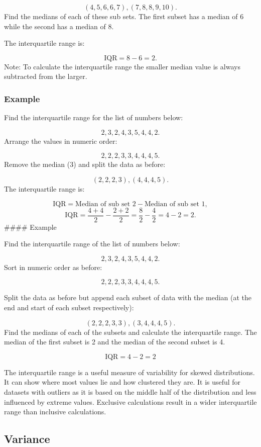 \documentclass[
]{book}
\begin{document}
\[ (4, 5, 6, 6, 7), (7, 8, 8, 9, 10). \]
Find the medians of each of these sub sets. The first subset has a median of 6 while the second has a median of 8.

The interquartile range is:

\[ \textrm{IQR} = 8 - 6 = 2.\]
Note: To calculate the interquartile range the smaller median value is always subtracted from the larger.

\hypertarget{example-9}{%
\subsubsection{Example}\label{example-9}}

Find the interquartile range for the list of numbers below:

\[2, 3, 2, 4, 3, 5, 4, 4, 2.\]
Arrange the values in numeric order:

\[2, 2, 2, 3, 3, 4, 4, 4, 5. \]
Remove the median (3) and split the data as before:

\[ (2, 2, 2, 3), (4, 4, 4, 5).\]
The interquartile range is:

\[ \textrm{IQR}=\textrm{Median of sub set 2}- \textrm{Median of sub set 1},\]
\[ \textrm{IQR}=\frac{4+4}{2} - \frac{2+2}{2}=\frac{8}{2} - \frac{4}{2} = 4 - 2= 2.\]
\#\#\#\# Example

Find the interquartile range of the list of numbers below:

\[ 2, 3, 2, 4, 3, 5, 4, 4, 2.\]
Sort in numeric order as before:

\[2, 2, 2, 3, 3, 4, 4, 4, 5.\]

Split the data as before but append each subset of data with the median (at the end and start of each subset respectively):

\[(2, 2, 2, 3, 3),(3, 4, 4, 4, 5).\]
Find the medians of each of the subsets and calculate the interquartile range. The median of the first subset is 2 and the median of the second subset is 4.

\[ \textrm{IQR} = 4 - 2 = 2 \]

The interquartile range is a useful measure of variability for skewed distributions. It can show where most values lie and how clustered they are. It is useful for datasets with outliers as it is based on the middle half of the distribution and less influenced by extreme values. Exclusive calculations result in a wider interquartile range than inclusive calculations.

\hypertarget{varr}{%
\subsection{Variance}\label{varr}}
\end{document}

